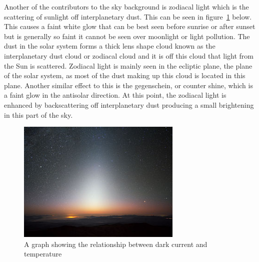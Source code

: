 		Another of the contributors to the sky background is zodiacal light which is the scattering of sunlight off interplanetary dust\cite[p.~5--6]{MNRMNR21602}. This can be seen in figure~\ref{fig:zodiacal_light} below. This causes a faint white glow that can be best seen before sunrise or after sunset but is generally so faint it cannot be seen over moonlight or light pollution. The dust in the solar system forms a thick lens shape cloud known as the interplanetary dust cloud or zodiacal cloud and it is off this cloud that light from the Sun is scattered. Zodiacal light is mainly seen in the ecliptic plane, the plane of the solar system, as most of the dust making up this cloud is located in this plane. Another similar effect to this is the gegenschein, or counter shine, which is a faint glow in the antisolar direction\cite{Observational_Studies_of_Interplanetary_Dust}. At this point, the zodiacal light is enhanced by backscattering off interplanetary dust producing a small brightening in this part of the sky.
		\begin{figure}[!htb]
			\centering
			\includegraphics[width=0.7\textwidth]{../Images/zodiacal_light.jpeg}
			\caption{A graph showing the relationship between dark current and temperature}\label{fig:zodiacal_light}
		\end{figure}


